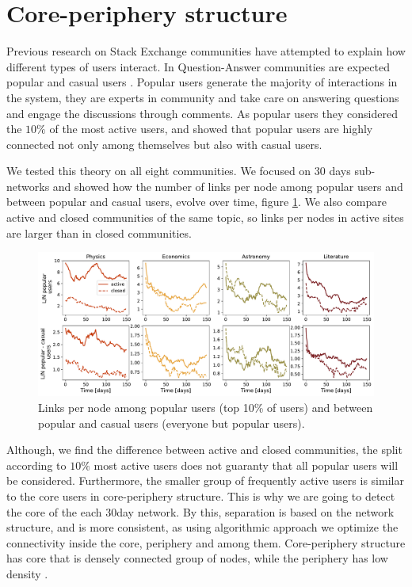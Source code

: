 \section{Core-periphery structure}

Previous research on Stack Exchange communities have attempted to explain how different types of users interact. In Question-Answer communities are expected popular and casual users \cite{santos2019activity, santos2019self}. Popular users generate the majority of interactions in the system, they are experts in community and take care on answering questions and engage the discussions through comments. As popular users they considered the $10 \%$ of the most active users, and showed that popular users are highly connected not only among themselves but also with casual users.

We tested this theory on all eight communities. We focused on 30 days sub-networks and showed how the number of links per node among popular users and between popular and casual users, evolve over time, figure \ref{fig:pop_cas_users}. We also compare active and closed communities of the same topic, so links per nodes in active sites are larger than in closed communities.

\begin{figure}[h!]
	\centering
	\includegraphics[width=\linewidth]{figures/stackexchange/popular_casual_users.pdf}
	\caption{Links per node among popular users (top 10\% of users) and between popular and casual users (everyone but popular users).}
	\label{fig:pop_cas_users}
\end{figure} 

Although, we find the difference between active and closed communities, the split according to $10\%$  most active users does not guaranty that all popular users will be considered. Furthermore, the smaller group of frequently active users is similar to the core users in core-periphery structure. This is why we are going to detect the core of the each 30day network. By this, separation is based on the network structure, and is more consistent, as using algorithmic approach we optimize the connectivity inside the core, periphery and among them. Core-periphery structure has core that is densely connected group of nodes, while the periphery has low density \cite{fortunato2010community, gallagher2020clarified}. 

